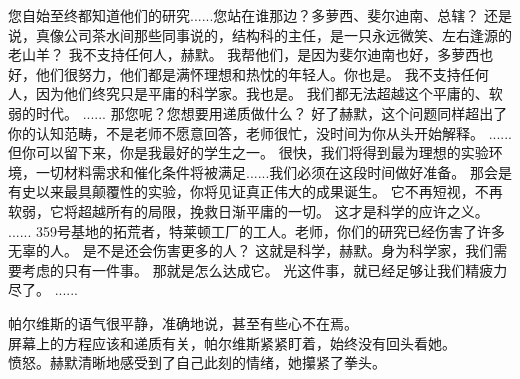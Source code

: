 \documentclass[openany]{book}
\begin{document}
\begin{dialogue}
     您自始至终都知道他们的研究......您站在谁那边？多萝西、斐尔迪南、总辖？
     还是说，真像公司茶水间那些同事说的，结构科的主任，是一只永远微笑、左右逢源的老山羊？
     我不支持任何人，赫默。
     我帮他们，是因为斐尔迪南也好，多萝西也好，他们很努力，他们都是满怀理想和热忱的年轻人。你也是。
     我不支持任何人，因为他们终究只是平庸的科学家。我也是。
     我们都无法超越这个平庸的、软弱的时代。
     ......
     那您呢？您想要用递质做什么？
     好了赫默，这个问题同样超出了你的认知范畴，不是老师不愿意回答，老师很忙，没时间为你从头开始解释。
     ......
     但你可以留下来，你是我最好的学生之一。
     很快，我们将得到最为理想的实验环境，一切材料需求和催化条件将被满足......我们必须在这段时间做好准备。
     那会是有史以来最具颠覆性的实验，你将见证真正伟大的成果诞生。
     它不再短视，不再软弱，它将超越所有的局限，挽救日渐平庸的一切。
     这才是科学的应许之义。
     ......
     359号基地的拓荒者，特莱顿工厂的工人。老师，你们的研究已经伤害了许多无辜的人。
     是不是还会伤害更多的人？
     这就是科学，赫默。身为科学家，我们需要考虑的只有一件事。
     那就是怎么达成它。
     光这件事，就已经足够让我们精疲力尽了。
     ......\par
    帕尔维斯的语气很平静，准确地说，甚至有些心不在焉。\\
    屏幕上的方程应该和递质有关，帕尔维斯紧紧盯着，始终没有回头看她。\\
    愤怒。赫默清晰地感受到了自己此刻的情绪，她攥紧了拳头。
\end{dialogue}
\end{document}
